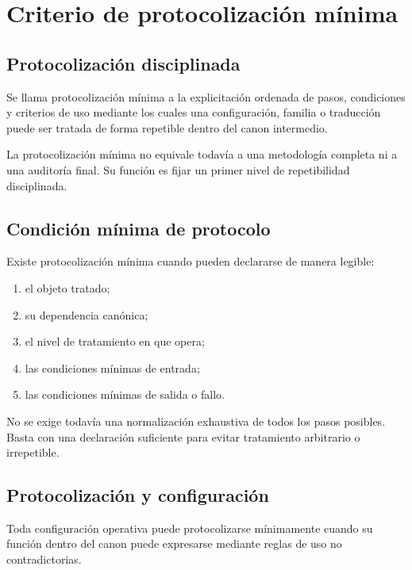 \chapter{Criterio de protocolización mínima}

\section{Protocolización disciplinada}
\begin{definition}
Se llama protocolización mínima a la explicitación ordenada de pasos, condiciones y criterios de uso mediante los cuales una configuración, familia o traducción puede ser tratada de forma repetible dentro del canon intermedio.
\end{definition}

\begin{observation}
La protocolización mínima no equivale todavía a una metodología completa ni a una auditoría final. Su función es fijar un primer nivel de repetibilidad disciplinada.
\end{observation}

\section{Condición mínima de protocolo}
\begin{definition}
Existe protocolización mínima cuando pueden declararse de manera legible:
\begin{enumerate}
  \item el objeto tratado;
  \item su dependencia canónica;
  \item el nivel de tratamiento en que opera;
  \item las condiciones mínimas de entrada;
  \item las condiciones mínimas de salida o fallo.
\end{enumerate}
\end{definition}

\begin{observation}
No se exige todavía una normalización exhaustiva de todos los pasos posibles. Basta con una declaración suficiente para evitar tratamiento arbitrario o irrepetible.
\end{observation}

\section{Protocolización y configuración}
\begin{definition}
Toda configuración operativa puede protocolizarse mínimamente cuando su función dentro del canon puede expresarse mediante reglas de uso no contradictorias.
\end{definition}

